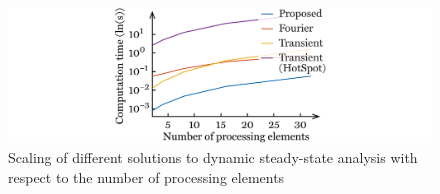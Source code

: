 \begin{figure}
  \centering
  \includegraphics[width=1.0\linewidth]{include/assets/figures/dream-dynamic-steady-state-speed-elements.pdf}
  \caption{
    Scaling of different solutions to dynamic steady-state analysis with respect
    to the number of processing elements
  }
\end{figure}
